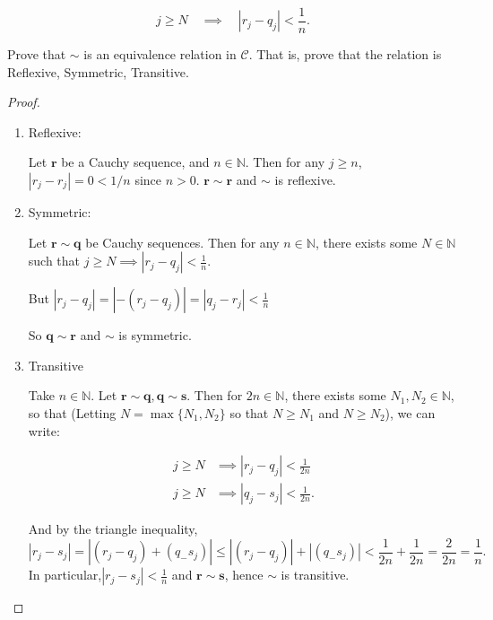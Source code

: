 \documentclass{article}
\begin{document}
\begin{enumerate}
$$j\ge N\quad\implies\quad|r_j-q_j|<\dfrac{1}{n}.$$

Prove that $\sim$ is an equivalence relation in $\mathcal{C}.$ That is, prove that the relation is Reflexive, Symmetric, Transitive.

\begin{proof} 
\begin{enumerate}[label= (\alph*)] 

    \item Reflexive:

    Let $\mathbf{r}$ be a Cauchy sequence, and $n\in \mathbb{N}$. Then for any $j\ge n$, $|r_j-r_j| =0<1/n$ since $n>0$. 
    $\mathbf{r}\sim \mathbf{r}$ and $\sim $ is reflexive.

    \item Symmetric:

        Let $\mathbf{r}\sim\mathbf{q}$ be Cauchy sequences. Then for any $n\in \mathbb{N}$, there exists some $N\in \mathbb{N}$ 
        such that $j\ge N \implies |{r_j}-{q_j}|<\frac{1}{n}$.

        But $|r_j-q_j|=|-(r_j-q_j)|=|q_j-r_j|<\frac{1}{n}$

        So $\mathbf{q}\sim \mathbf{r}$ and $\sim $ is symmetric.

    \item Transitive

        Take $n\in \mathbb{N}$. Let $\mathbf{r}\sim \mathbf{q}, \mathbf{q}\sim \mathbf{s}$. Then for $2n\in \mathbb{N}$,
        there exists some $N_1,N_2\in \mathbb{N}$, so that 
        (Letting $N=\max \{N_1,N_2\}$ so that $N\ge N_1$ and $N\ge N_2$), we can write:

        \begin{align*}
             j\ge N&\implies|r_j-q_j|<\frac{1}{2n}\\
             j\ge N&\implies|q_j-s_j|<\frac{1}{2n}
        .\end{align*}

        And by the triangle inequality, 
        \[
        |r_j-s_j|=|(r_j-q_j)+(q_-s_j)|\leq|(r_j-q_j)|+|(q_-s_j)|<\frac{1}{2n}+\frac{1}{2n}=\frac{2}{2n}=\frac{1}{n}
        .\] 
        In particular,$ |r_j-s_j|<\frac{1}{n}$ and $\mathbf{r}\sim \mathbf{s}$, hence $\sim $ is transitive.

\end{enumerate}
\end{proof}
\end{enumerate}
\end{document}
